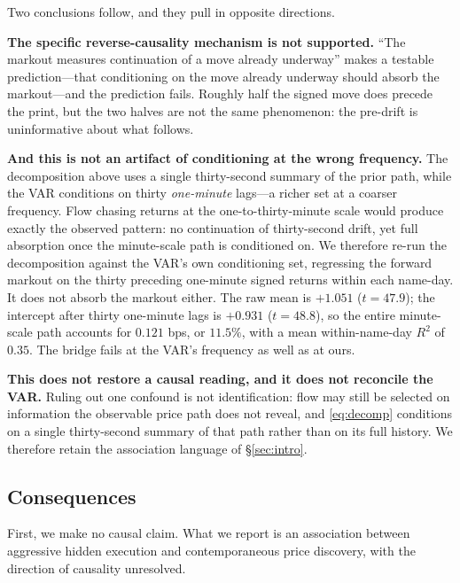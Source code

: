 \documentclass[11pt]{article}
\begin{document}
Two conclusions follow, and they pull in opposite directions.

\textbf{The specific reverse-causality mechanism is not supported.} ``The markout measures
continuation of a move already underway'' makes a testable prediction---that conditioning on
the move already underway should absorb the markout---and the prediction fails. Roughly half
the signed move does precede the print, but the two halves are not the same phenomenon: the
pre-drift is uninformative about what follows.

\textbf{And this is not an artifact of conditioning at the wrong frequency.} The
decomposition above uses a single thirty-second summary of the prior path, while the VAR
conditions on thirty \emph{one-minute} lags---a richer set at a coarser frequency. Flow
chasing returns at the one-to-thirty-minute scale would produce exactly the observed pattern:
no continuation of thirty-second drift, yet full absorption once the minute-scale path is
conditioned on. We therefore re-run the decomposition against the VAR's own conditioning set,
regressing the forward markout on the thirty preceding one-minute signed returns within each
name-day. It does not absorb the markout either. The raw mean is $+1.051$ ($t=47.9$); the
intercept after thirty one-minute lags is $+0.931$ ($t=48.8$), so the entire minute-scale
path accounts for $0.121$ bps, or $11.5\%$, with a mean within-name-day $R^2$ of $0.35$. The
bridge fails at the VAR's frequency as well as at ours.

\textbf{This does not restore a causal reading, and it does not reconcile the VAR.} Ruling
out one confound is not identification: flow may still be selected on information the
observable price path does not reveal, and \eqref{eq:decomp} conditions on a single
thirty-second summary of that path rather than on its full history. We therefore retain the
association language of \S\ref{sec:intro}.

\subsection{Consequences}

First, we make no causal claim. What we report is an association between aggressive hidden
execution and contemporaneous price discovery, with the direction of causality unresolved.
\end{document}
